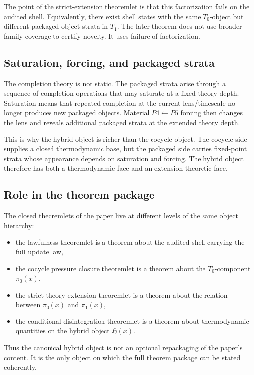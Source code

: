 \documentclass[11pt]{article}
\theoremstyle{definition}
\newcommand{\Tzero}{T_0}
\newcommand{\Tone}{T_1}
\newcommand{\Hybrid}{\mathfrak{H}}
\begin{document}
The point of the strict-extension theoremlet is that this factorization fails on the audited shell. Equivalently, there exist shell states with the same \(\Tzero\)-object but different packaged-object strata in \(\Tone\). The later theorem does not use broader family coverage to certify novelty. It uses failure of factorization.

\subsection{Saturation, forcing, and packaged strata}

The completion theory is not static. The packaged strata arise through a sequence of completion operations that may saturate at a fixed theory depth. Saturation means that repeated completion at the current lens/timescale no longer produces new packaged objects. Material \(P4\leftarrow P5\) forcing then changes the lens and reveals additional packaged strata at the extended theory depth.

This is why the hybrid object is richer than the cocycle object. The cocycle side supplies a closed thermodynamic base, but the packaged side carries fixed-point strata whose appearance depends on saturation and forcing. The hybrid object therefore has both a thermodynamic face and an extension-theoretic face.

\subsection{Role in the theorem package}

The closed theoremlets of the paper live at different levels of the same object hierarchy:
\begin{itemize}
    \item the lawfulness theoremlet is a theorem about the audited shell carrying the full update law,
    \item the cocycle pressure closure theoremlet is a theorem about the \(\Tzero\)-component \(\pi_0(x)\),
    \item the strict theory extension theoremlet is a theorem about the relation between \(\pi_0(x)\) and \(\pi_1(x)\),
    \item the conditional disintegration theoremlet is a theorem about thermodynamic quantities on the hybrid object \(\Hybrid(x)\).
\end{itemize}
Thus the canonical hybrid object is not an optional repackaging of the paper’s content. It is the only object on which the full theorem package can be stated coherently.
\end{document}
